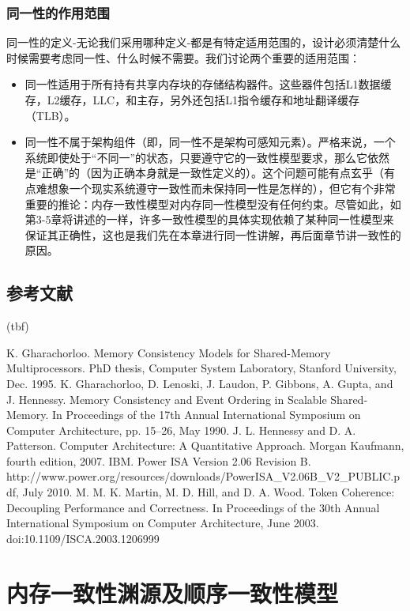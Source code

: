 \documentclass[UTF-8]{ctexrep}
\begin{document}
\subsection{同一性的作用范围}
同一性的定义-无论我们采用哪种定义-都是有特定适用范围的，设计必须清楚什么时候需要考虑同一性、什么时候不需要。我们讨论两个重要的适用范围：
\begin{itemize}
\item 同一性适用于所有持有共享内存块的存储结构器件。这些器件包括L1数据缓存，L2缓存，LLC，和主存，另外还包括L1指令缓存和地址翻译缓存（TLB）。
\item 同一性不属于架构组件（即，同一性不是架构可感知元素）。严格来说，一个系统即使处于“不同一”的状态，只要遵守它的一致性模型要求，那么它依然是“正确”的（因为正确本身就是一致性定义的）。这个问题可能有点玄乎（有点难想象一个现实系统遵守一致性而未保持同一性是怎样的），但它有个非常重要的推论：内存一致性模型对内存同一性模型没有任何约束。尽管如此，如第3-5章将讲述的一样，许多一致性模型的具体实现依赖了某种同一性模型来保证其正确性，这也是我们先在本章进行同一性讲解，再后面章节讲一致性的原因。

\end{itemize}
\section{参考文献}
(tbf)
\begin{thebibliography}{99}
K. Gharachorloo. Memory Consistency Models for Shared-Memory Multiprocessors. PhD thesis, Computer System Laboratory, Stanford University, Dec. 1995.
K. Gharachorloo, D. Lenoski, J. Laudon, P. Gibbons, A. Gupta, and J. Hennessy. Memory Consistency and Event Ordering in Scalable Shared-Memory. In Proceedings of the 17th
Annual International Symposium on Computer Architecture, pp. 15–26, May 1990.
J. L. Hennessy and D. A. Patterson. Computer Architecture: A Quantitative Approach. Morgan Kaufmann, fourth edition, 2007.
IBM. Power ISA Version 2.06 Revision B. http://www.power.org/resources/downloads/PowerISA\_V2.06B\_V2\_PUBLIC.pdf, July 2010.
M. M. K. Martin, M. D. Hill, and D. A. Wood. Token Coherence: Decoupling Performance and Correctness. In Proceedings of the 30th Annual International Symposium on Computer Architecture, June 2003. doi:10.1109/ISCA.2003.1206999
\end{thebibliography}




\chapter{内存一致性渊源及顺序一致性模型}





















\par















 
\end{document}
